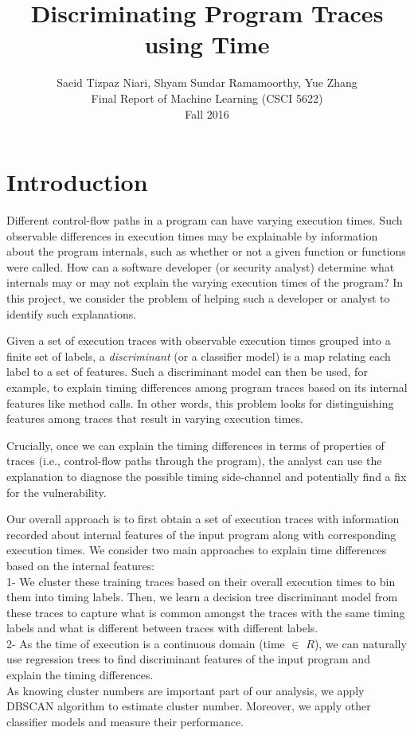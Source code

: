 \documentclass{article}
\begin{document}
\title{Discriminating Program Traces using Time}
\author{Saeid Tizpaz Niari, Shyam Sundar Ramamoorthy, Yue Zhang \\ Final Report of Machine Learning (CSCI 5622)  \\ Fall 2016}
\date{}
\maketitle

\section{Introduction}
Different control-flow paths in a program can have varying execution times.
Such observable differences in execution times may be explainable by
information about the program internals, such as whether or not a given function or
functions were called. 
How can a software developer (or security analyst)
determine what internals may or may not explain the varying
execution times of the program? In this project, we consider the problem
of helping such a developer 
or analyst to identify such explanations. 

Given a set of execution traces with observable execution times grouped
into a finite set of labels, a \emph{discriminant} (or a classifier model) is
a map relating each label to a set of features. Such a discriminant model can then be used,
for example, to explain timing differences among program traces based on
its internal features like method calls.  In other words, this problem looks for
distinguishing features among traces that result in
varying execution times.

Crucially, once we can explain the timing
differences in terms of properties of traces (i.e., control-flow paths through
the program), the analyst can use the explanation to diagnose the possible
timing side-channel and potentially find a fix for the vulnerability. 

Our overall approach is to first obtain a set of execution traces
with information recorded about internal features of the input program
along with corresponding execution times. We consider two main
approaches to explain time differences based on the internal features: \\
1- We cluster these training traces based on their overall execution times
to bin them into timing labels. Then, we learn a decision tree discriminant
model from these traces to capture what is common amongst the traces with the
same timing labels and what is different between traces with different labels. \\
2- As the time of execution is a continuous domain (time $\in$ $R$), we can
naturally use regression trees to find discriminant features of the input
program and explain the timing differences. \\
As knowing cluster numbers are important part of our analysis, we apply DBSCAN algorithm
to estimate cluster number. Moreover, we apply other classifier models and measure their
performance.
\end{document}

